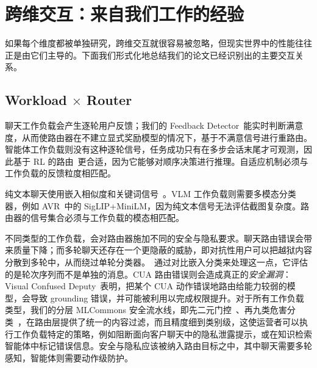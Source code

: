 \section{跨维交互：来自我们工作的经验}
\label{sec:cross}

如果每个维度都被单独研究，跨维交互就很容易被忽略，但现实世界中的性能往往正是由它们主导的。下面我们形式化地总结我们的论文已经识别出的主要交互关系。

\subsection{Workload $\times$ Router}
\label{sec:cross:wr}

\begin{observation}[工作负载决定路由器的自适应机制]
\label{obs:wr-adapt}
聊天工作负载会产生逐轮用户反馈；我们的 Feedback Detector~\cite{feedbackdet2026}能实时判断满意度，从而使路由器在不建立显式奖励模型的情况下，基于不满意信号进行重路由。智能体工作负载则没有这种逐轮信号，任务成功只有在多步会话末尾才可观测，因此基于 RL 的路由~\cite{routerr1_2025}更合适，因为它能够对顺序决策进行推理。自适应机制必须与工作负载的反馈粒度相匹配。
\end{observation}

\begin{observation}[模态决定路由信号]
\label{obs:wr-modal}
纯文本聊天使用嵌入相似度和关键词信号~\cite{vllmsr2026}。VLM 工作负载则需要多模态分类器，例如 AVR~\cite{avr2026}中的 SigLIP+MiniLM，因为纯文本信号无法评估截图复杂度。路由器的信号集合必须与工作负载的模态相匹配。
\end{observation}

\begin{observation}[工作负载决定路由中的安全与隐私需求]
\label{obs:wr-safety}
不同类型的工作负载，会对路由器施加不同的安全与隐私要求。聊天路由错误会带来质量下降；而多轮聊天还存在一个更隐蔽的威胁，即对抗性用户可以把越狱内容分散到多轮中，从而绕过单轮分类器。\vsr{}~\cite{vllmsr2026}通过对比嵌入分类来处理这一点，它评估的是轮次序列而不是单独的消息。CUA 路由错误则会造成真正的\emph{安全漏洞}：Visual Confused Deputy~\cite{vcd2026}表明，把某个 CUA 动作错误地路由给能力较弱的模型，会导致 grounding 错误，并可能被利用以完成权限提升。对于所有工作负载类型，我们的分层 MLCommons 安全流水线，即先二元门控~\cite{safetyl1_2026}、再九类危害分类~\cite{safetyl2_2026}，在路由层提供了统一的内容过滤，而且精度细到类别级，这使运营者可以执行工作负载特定的策略，例如阻断面向客户聊天中的隐私泄露提示，或在知识检索智能体中标记错误信息。安全与隐私应该被纳入路由目标之中，其中聊天需要多轮感知，智能体则需要动作级防护。
\end{observation}

